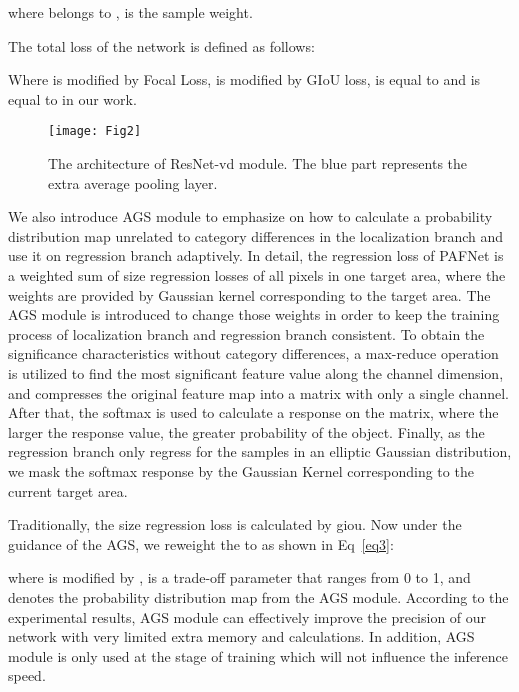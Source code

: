 \documentclass[10pt,twocolumn,letterpaper]{article}
\begin{document}
    where  belongs to ,   is the sample weight.

    The total loss of the network is defined as follows:
    
    Where  is modified by Focal Loss,  is modified by GIoU loss,  is equal to  and  is equal to  in our work.
    
    \begin{figure}[h]
\begin{center}
			\centerline{\texttt{[image: Fig2]}}
			\caption{The architecture of ResNet-vd module. The blue part represents the extra average pooling layer.}
			\label{Fig2}
		\end{center}
\end{figure}











    We also introduce AGS module to emphasize on how to calculate a probability distribution map unrelated to category differences in the localization branch and use it on regression branch adaptively. In detail, the regression loss of PAFNet is a weighted sum of size regression losses of all pixels in one target area, where the weights are provided by Gaussian kernel corresponding to the target area. The AGS module is introduced to change those weights in order to keep the training process of localization branch and regression branch consistent. To obtain the significance characteristics without category differences, a max-reduce operation is utilized to find the most significant feature value along the channel dimension, and compresses the original feature map into a matrix with only a single channel. After that, the softmax is used to calculate a response on the matrix, where the larger the response value, the greater probability of the object. Finally, as the regression branch only regress for the samples in an elliptic Gaussian distribution, we mask the softmax response by the Gaussian Kernel corresponding to the current target area. 
    
    Traditionally, the size regression loss is calculated by giou. Now under the guidance of the AGS, we reweight the  to  as shown in Eq~\ref{eq3}:
    
    
    
    where  is modified by ,  is a trade-off parameter that ranges from 0 to 1, and  denotes the probability distribution map from the AGS module. According to the experimental results, AGS module can effectively improve the precision of our network with very limited extra memory and calculations. In addition, AGS module is only used at the stage of training which will not influence the inference speed.
    
\end{document}
